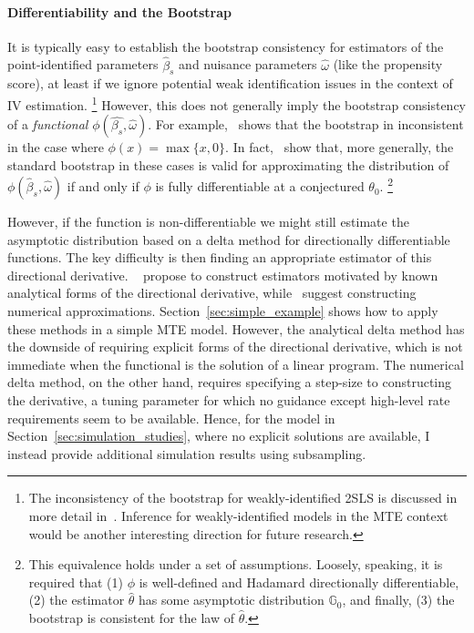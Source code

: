 \documentclass[12pt,a4paper,english]{article} %
\numberwithin{equation}{section}
\theoremstyle{definition}
\theoremstyle{remark}
\theoremstyle{plain}
\begin{document}
\paragraph{Differentiability and the Bootstrap}
It is typically easy to establish the bootstrap consistency for estimators of the point-identified parameters $\hat{\beta}_s$ and nuisance parameters $\hat{\omega}$ (like the propensity score), at least if we ignore potential weak identification issues in the context of IV estimation.
\footnote{
  The inconsistency of the bootstrap for weakly-identified 2SLS is discussed in more detail in~\cite{andrews2010applications}.
  Inference for weakly-identified models in the MTE context would be another interesting direction for future research.
}
However, this does not generally imply the bootstrap consistency of a \textit{functional} $\phi(\hat{\beta_s}, \hat{\omega})$.
For example,~\cite{andrews2000inconsistency} shows that the bootstrap in inconsistent in the case where $\phi(x) = \max\{x, 0\}$.
In fact,~\cite{fang2019infdirdiff} show that, more generally, the standard bootstrap in these cases is valid for approximating the distribution of $\phi(\hat{\beta}_s, \hat{\omega})$ if and only if $\phi$ is fully differentiable at a conjectured $\theta_0$.
\footnote{
  This equivalence holds under a set of assumptions. Loosely, speaking, it is required that
  (1) $\phi$ is well-defined and Hadamard directionally differentiable,
  (2) the estimator $\hat{\theta}$ has some asymptotic distribution $\mathbb{G}_0$, and finally,
  (3) the bootstrap is consistent for the law of $\hat{\theta}$.
}

However, if the function is non-differentiable we might still estimate the asymptotic distribution based on a delta method for directionally differentiable functions.
The key difficulty is then finding an appropriate estimator of this directional derivative.
~\cite{fang2019infdirdiff} propose to construct estimators motivated by known analytical forms of the directional derivative, while~\cite{hong2018numerical} suggest constructing numerical approximations.
Section~\ref{sec:simple_example} shows how to apply these methods in a simple MTE model.
However, the analytical delta method has the downside of requiring explicit forms of the directional derivative, which is not immediate when the functional is the solution of a linear program.
The numerical delta method, on the other hand, requires specifying a step-size to constructing the derivative, a tuning parameter for which no guidance except high-level rate requirements seem to be available.
Hence, for the model in Section~\ref{sec:simulation_studies}, where no explicit solutions are available, I instead provide additional simulation results using subsampling.
\end{document}
